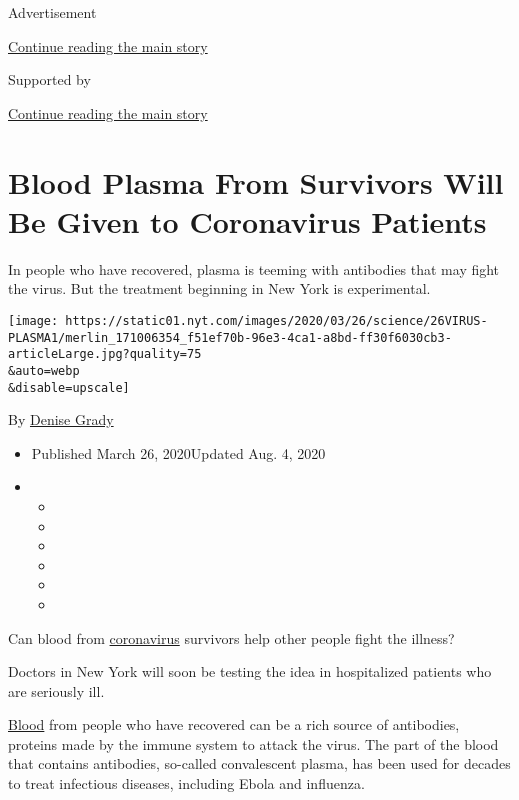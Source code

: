 Advertisement

\protect\hyperlink{after-top}{Continue reading the main story}

Supported by

\protect\hyperlink{after-sponsor}{Continue reading the main story}

\hypertarget{blood-plasma-from-survivors-will-be-given-to-coronavirus-patients}{%
\section{Blood Plasma From Survivors Will Be Given to Coronavirus
Patients}\label{blood-plasma-from-survivors-will-be-given-to-coronavirus-patients}}

In people who have recovered, plasma is teeming with antibodies that may
fight the virus. But the treatment beginning in New York is
experimental.

\texttt{[image: https://static01.nyt.com/images/2020/03/26/science/26VIRUS-PLASMA1/merlin\_171006354\_f51ef70b-96e3-4ca1-a8bd-ff30f6030cb3-articleLarge.jpg?quality=75\\\&auto=webp\\\&disable=upscale]}

By \href{https://www.nytimes.com/by/denise-grady}{Denise Grady}

\begin{itemize}
\item
  Published March 26, 2020Updated Aug. 4, 2020
\item
  \begin{itemize}
  \item
  \item
  \item
  \item
  \item
  \item
  \end{itemize}
\end{itemize}

Can blood from
\href{https://www.nytimes.com/2020/08/04/health/trump-plasma.html}{coronavirus}
survivors help other people fight the illness?

Doctors in New York will soon be testing the idea in hospitalized
patients who are seriously ill.

\href{https://www.nytimes.com/2020/08/04/health/trump-plasma.html}{Blood}
from people who have recovered can be a rich source of antibodies,
proteins made by the immune system to attack the virus. The part of the
blood that contains antibodies, so-called convalescent plasma, has been
used for decades to treat infectious diseases, including Ebola and
influenza.

